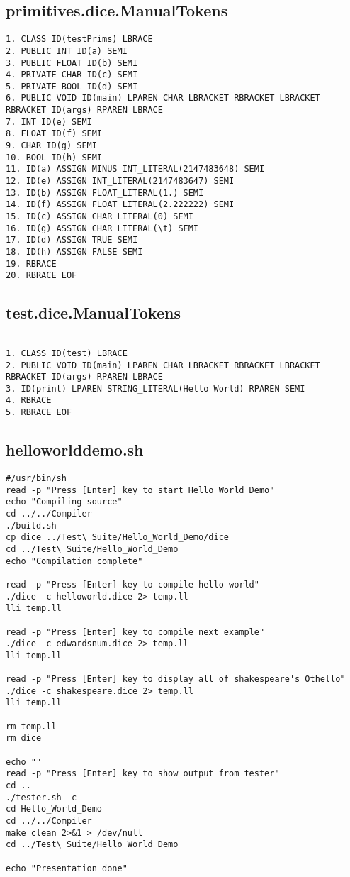\subsection{primitives.dice.ManualTokens}
\begin{verbatim}
1. CLASS ID(testPrims) LBRACE
2. PUBLIC INT ID(a) SEMI
3. PUBLIC FLOAT ID(b) SEMI
4. PRIVATE CHAR ID(c) SEMI
5. PRIVATE BOOL ID(d) SEMI
6. PUBLIC VOID ID(main) LPAREN CHAR LBRACKET RBRACKET LBRACKET RBRACKET ID(args) RPAREN LBRACE
7. INT ID(e) SEMI
8. FLOAT ID(f) SEMI
9. CHAR ID(g) SEMI
10. BOOL ID(h) SEMI
11. ID(a) ASSIGN MINUS INT_LITERAL(2147483648) SEMI
12. ID(e) ASSIGN INT_LITERAL(2147483647) SEMI
13. ID(b) ASSIGN FLOAT_LITERAL(1.) SEMI
14. ID(f) ASSIGN FLOAT_LITERAL(2.222222) SEMI
15. ID(c) ASSIGN CHAR_LITERAL(0) SEMI
16. ID(g) ASSIGN CHAR_LITERAL(\t) SEMI
17. ID(d) ASSIGN TRUE SEMI
18. ID(h) ASSIGN FALSE SEMI
19. RBRACE
20. RBRACE EOF

\end{verbatim}
\pagebreak
\subsection{test.dice.ManualTokens}
\begin{verbatim}

1. CLASS ID(test) LBRACE
2. PUBLIC VOID ID(main) LPAREN CHAR LBRACKET RBRACKET LBRACKET RBRACKET ID(args) RPAREN LBRACE
3. ID(print) LPAREN STRING_LITERAL(Hello World) RPAREN SEMI
4. RBRACE
5. RBRACE EOF

\end{verbatim}
\pagebreak
\subsection{helloworlddemo.sh}
\begin{verbatim}
#/usr/bin/sh
read -p "Press [Enter] key to start Hello World Demo"
echo "Compiling source"
cd ../../Compiler
./build.sh
cp dice ../Test\ Suite/Hello_World_Demo/dice
cd ../Test\ Suite/Hello_World_Demo
echo "Compilation complete"

read -p "Press [Enter] key to compile hello world"
./dice -c helloworld.dice 2> temp.ll
lli temp.ll

read -p "Press [Enter] key to compile next example"
./dice -c edwardsnum.dice 2> temp.ll
lli temp.ll

read -p "Press [Enter] key to display all of shakespeare's Othello"
./dice -c shakespeare.dice 2> temp.ll
lli temp.ll

rm temp.ll
rm dice

echo ""
read -p "Press [Enter] key to show output from tester"
cd ..
./tester.sh -c
cd Hello_World_Demo
cd ../../Compiler
make clean 2>&1 > /dev/null
cd ../Test\ Suite/Hello_World_Demo

echo "Presentation done"
\end{verbatim}
\pagebreak
